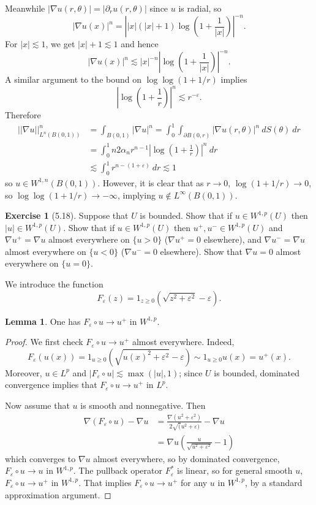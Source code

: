 \documentclass[10pt]{article}
\theoremstyle{definition}
\newtheorem{exer}{Exercise}
\newtheorem{lemma}{Lemma}[exer]
\begin{document}
Meanwhile $|\nabla u(r, \theta)| = |\partial_r u(r, \theta)|$ since $u$ is radial, so
$$|\nabla u(x)|^n = \left||x|(|x|+1) \log\left(1 + \frac{1}{|x|}\right) \right|^{-n}.$$
For $|x| \lesssim 1$, we get $|x| + 1 \lesssim 1$ and hence
$$|\nabla u(x)|^n \lesssim |x|^{-n} \left|\log\left(1 + \frac{1}{|x|}\right) \right|^{-n}.$$
A similar argument to the bound on $\log \log(1+1/r)$ implies
$$\left|\log \left(1 + \frac{1}{r}\right)\right|^n \lesssim r^{-\varepsilon}.$$
Therefore
\begin{align*}
||\nabla u||_{L^n(B(0,1))}^n &= \int_{B(0, 1)} |\nabla u|^n = \int_0^1 \int_{\partial B(0, r)} |\nabla u(r, \theta)|^n ~dS(\theta) ~dr\\
&= \int_0^1 n2\alpha_n r^{n-1} \left|\log \left(1 + \frac{1}{r}\right)\right|^n ~dr\\
&\lesssim \int_0^1 r^{n-(1 + \varepsilon)} ~dr \lesssim 1
\end{align*}
so $u \in W^{1,n}(B(0, 1))$.
However, it is clear that as $r \to 0$, $\log(1+1/r) \to 0$, so $\log \log(1 + 1/r) \to -\infty$, implying $u \notin L^\infty(B(0, 1))$.

\begin{exer}[5.18]
Suppose that $U$ is bounded. Show that if $u \in W^{1,p}(U)$ then $|u| \in W^{1,p}(U)$.
Show that if $u \in W^{1,p}(U)$ then $u^+,u^- \in W^{1,p}(U)$ and $\nabla u^+ = \nabla u$ almost everywhere on $\{u > 0\}$ ($\nabla u^+ = 0$ elsewhere), and $\nabla u^- = \nabla u$ almost everywhere on $\{u < 0\}$ ($\nabla u^- = 0$ elsewhere).
Show that $\nabla u = 0$ almost everywhere on $\{u = 0\}$.
\end{exer}

We introduce the function
$$F_\varepsilon(z) = 1_{z \geq 0}(\sqrt{z^2 + \varepsilon^2} - \varepsilon).$$
\begin{lemma}
One has $F_\varepsilon \circ u \to u^+$ in $W^{1,p}$.
\end{lemma}
\begin{proof}
We first check $F_\varepsilon \circ u \to u^+$ almost everywhere. Indeed,
$$F_\varepsilon(u(x)) = 1_{u \geq 0}(\sqrt{u(x)^2 + \varepsilon^2} - \varepsilon) \sim 1_{u \geq 0}u(x) = u^+(x).$$
Moreover, $u \in L^p$ and $|F_\varepsilon \circ u| \lesssim \max(|u|, 1)$; since $U$ is bounded, dominated convergence implies that $F_\varepsilon \circ u \to u^+$ in $L^p$.

Now assume that $u$ is smooth and nonnegative. Then
\begin{align*}
\nabla(F_\varepsilon \circ u) - \nabla u &= \frac{\nabla(u^2 + \varepsilon^2)}{2\sqrt(u^2 + \varepsilon)} - \nabla u\\
&= \nabla u \left(\frac{u}{\sqrt{u^2 + \varepsilon^2}} - 1\right)
\end{align*}
which converges to $\nabla u$ almost everywhere, so by dominated convergence, $F_\varepsilon \circ u \to u$ in $W^{1,p}$.
The pullback operator $F_\varepsilon^*$ is linear, so for general smooth $u$, $F_\varepsilon \circ u \to u^+$ in $W^{1,p}$.
That implies $F_\varepsilon \circ u \to u^+$ for any $u$ in $W^{1,p}$, by a standard approximation argument.
\end{proof}
\end{document}
